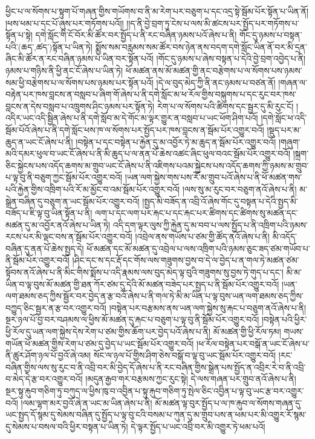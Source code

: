 ཕྱིང་པ་ལ་སོགས་པ་སྟུག་པོ་གཞན་གྱིས་གཡོགས་བ་ནི་མ་རེག་པར་བཅུག་པ་དང་འདྲ་སྟེ་སྦོམ་པོར་སྟོན་པ་ཡིན་ནོ། །ཕས་ཕམ་པ་དང་པོ་ཞུས་པར་གཏོགས་པའོ།། །།ད་ནི་བྱེ་བྲག་ཏུ་ངེས་པ་ལས་མི་ཚངས་པར་སྤྱོད་པར་གཏོགས་པ་སྟོན་པ་སྟེ། དགེ་སློང་གི་ངོ་བོར་མི་ཚོར་བར་སྤྱོད་པ་ནི་རང་བཞིན་ཉམས་པའོ་ཞེས་པ་ནི། གོང་དུ་ཉམས་པ་བསྟན་པའི་(ཆད་‚ཚད་)སྟོན་པ་ཡིན་ཏེ། སྨྱོས་སམ་བརླམས་སམ་ཚོར་བས་ཉེན་ནས་བདག་དགེ་སློང་ཡིན་ནོ་བར་མི་དྲན་ཞིང་མི་ཚོར་ན་རང་བཞིན་ཉམས་པ་ཡིན་བར་སྟོན་པའོ། །གོང་དུ་ཉམས་པ་ཞེས་བསྟན་པ་དེའི་བྱེ་བྲག་འབྱེད་པ་ནི། ཉམས་པ་གཉིས་ནི་ཕྱི་ནང་ངོ་ཞེས་པ་ཡིན་ཏེ། ཕོ་མཚན་ནས་མོ་མཚན་གྱི་ནང་བརྩེགས་པ་ལ་སོགས་པས་ཉམས་སམ་ཕྱི་བརྩེགས་པ་ལ་སོགས་པས་ཉམས་པར་སྟོན་པའོ། །དེ་ལ་བུད་མེད་ཀྱི་ནི་ནང་ཉམས་པ་བཙན་ནོ། །གཞན་ལ་བརྟེན་པར་ཁས་བླངས་ན་བསླབ་པ་ཞིག་གོ་ཞེས་པ་ནི་དགེ་སློང་མ་ཕ་རོལ་གྱིས་བསྐུགས་པ་དང་རུང་བར་ཁས་བླངས་ན་དེས་བསླབ་པ་འཁྲུགས་ཤིང་ཉམས་པར་སྟོན་ཏེ། རེག་པ་ལ་སོགས་པའི་ཚིགས་དང་སྦྱར་དུ་མི་རུང་ངོ། །འདིར་ཡང་འདི་སྦྱིན་ཞེས་པ་ནི་དགེ་སློབ་མ་དེ་གོང་མ་ལྟར་གྱུར་ན་བསླབ་པ་ཡང་ཕོག་ཤིག་པའོ། །དགེ་སློང་ཕ་འདི་སྦོམ་པོའོ་ཞེས་པ་ནི་དགེ་སློང་ཕས་ཁ་ལ་སོགས་པར་སྤྱོད་པར་ཁས་བླངས་ན་སྦོམ་པོར་འགྱུར་བའོ། །སྡུད་པར་མ་ཆུད་ན་ཡང་ངོ་ཞེས་པ་ནི། །བསྟེན་པ་དང་བསྟེན་པ་རྐྱེན་དུ་མ་འབྱོར་ཏེ་མ་ཆུད་ན་སྦོམ་པོར་འགྱུར་བའོ། །གཞུག་མའི་དམར་ཕུལ་བ་ཡང་ངོ་ཞེས་པ་ནི་མི་ཆུད་པ་ལ་ནན་པོ་ཆེས་འཚང་ཞིང་ཕུལ་བའང་སྦོམ་པོར་འགྱུར་བའོ། །སྐྲག་ཅིང་སྐྱེངས་པས་འདོད་ཆགས་མ་གྲུབ་ཡང་ངོ་ཞེས་པ་ནི་འཇིགས་པའམ་སྐྱེངས་པས་འདོད་ཆགས་ཀྱི་ཉམས་མ་གྲུབ་པ་ལྟ་བུ་ནི་བཅུག་ཀྱང་སྦོམ་པོར་འགྱུར་བའོ། །ཡན་ལག་སྐྱེས་གས་པས་རོ་མ་གྲུབ་པའོ་ཞེས་པ་ནི་ཕོ་མཚན་གས་པའི་རྐྱེན་གྱིས་འཁྲིག་པའི་རོ་མ་མྱོང་བ་འམ་སྦོམ་པོར་འགྱུར་བའོ། །ལས་སུ་མ་རུང་བར་བཅུག་ནའོ་ཞེས་པ་ནི། མ་སྒྲེན་བཞིན་དུ་བཅུག་ན་ཡང་སྦོམ་པོར་འགྱུར་བའོ། །སྤྱད་མི་བཟོད་ན་འབྲི་འོ་ཞེས་གོང་དུ་བསྟན་པ་དེའི་སྤྱད་མི་བཟོད་པ་ཇི་ལྟ་བུ་ཡིན་སྟོན་པ་ནི། ལག་པ་དང་ལག་པར་རྐང་པ་དང་རྐང་པར་ཚིགས་དང་ཚིགས་སུ་མཚན་དང་མཚན་དུ་མ་འབྱོར་ནའོ་ཞེས་པ་ཡིན་ཏེ། འདི་དག་ལྟར་ལུས་ཀྱི་རྐྱེན་དུ་མ་བབ་པ་ལས་སྤྱོད་པ་ནི་འཁྲིག་པའི་ཉམས་རངས་པར་མི་ལྡང་བས་ན་སྦོམ་པོར་འགྱུར་བའོ། །འབྲེལ་ནས་གཡོས་པ་ཙམ་གྱི་ཚོད་ནའོ་ཞེས་པ་ནི། མི་འདོད་བཞིན་དུ་ནན་པོ་ཆེས་སྤྱད་དེ། ཕོ་མཚན་དང་མོ་མཚན་དུ་འབྲེལ་པ་ལས་འཁྲིག་པའི་ཉམས་ཅུང་ཟད་ཙམ་གཡོབ་པ་ནི་སྦོམ་པོར་འགྱུར་བའོ། །ཤིང་དང་ས་དང་རྡོ་དང་གོས་ལས་གཟུགས་བྱས་བ་དེ་ལ་བྱེད་པ་ན་གལ་ཏེ་མཚན་ཙམ་སྟོབས་ནའོ་ཞེས་པ་ནི་མིང་གིས་སྨོས་པ་འདི་རྣམས་ལས་བུད་མེད་ལྟ་བུའི་གཟུགས་སུ་བྱས་ཏེ་གུད་པ་དང་། མི་མ་ཡིན་བ་ལྟ་བུས་མོ་མཚན་གྱི་ཐན་ཀོར་ཙམ་དུ་དེའི་མོ་མཚན་བཟེད་པར་སྤྱད་པ་ནི་སྦོམ་པོར་འགྱུར་བའོ། །ཡན་ལག་ཐམས་ཅད་ཀྱིས་སྦྱོར་བར་བྱེད་ན་རྩ་བའོ་ཞེས་པ་ནི་གལ་ཏེ་མི་མ་ཡིན་པ་ལྟ་བུས་ཡན་ལག་ཐམས་ཅད་ཀྱིས་བཀྱུད་ཅིང་སྦྱར་ན་རྩ་བར་འགྱུར་བའོ། །བསྟེན་པར་བརྩམས་ནས་ཡན་ལག་སྐྱེས་སུ་རྐང་པ་བཅུག་ནའོ་ཞེས་པ་ནི། སྔར་ཉལ་པོ་བྱ་བར་བཤམས་ལ་ཕྱིས་མོ་མཚན་དུ་རྐང་པ་བཅུག་པ་ལྟ་བུ་ནི་སྦོམ་པོར་འགྱུར་བའོ། །བསྟེན་པའི་ཕྱིར་ཕྱི་རོལ་དུ་ཡན་ལག་སྐྱེས་དེས་རེག་པ་ཙམ་གྱིས་ཆོག་པར་བྱེད་པའོ་ཞེས་པ་ནི། མོ་མཚན་གྱི་ཕྱི་རོལ་ཏམ། གཡས་གཡོན་ཕོ་མཚན་གྱིས་རེག་པ་ཙམ་དུ་བྱེད་པ་ཡང་སྦོམ་པོར་འགྱུར་བའོ། །ཕ་རོལ་བསྟེན་པར་བསྒོ་ན་ཡང་ངོ་ཞེས་པ་ནི་ཚུར་ཤོག་ཉལ་པོ་བྱའོ་ཞེ་འམ། སོང་ལ་ཉལ་པོ་གྱིས་ཤིག་ཅེས་བསྒོ་བ་ལྟ་བུ་ཡང་སྦོམ་པོར་འགྱུར་བའོ། །རང་བཞིན་གྱིས་ལས་སུ་རུང་བ་ནི་འབྲི་བར་མི་བྱེད་དོ་ཞེས་པ་ནི་རང་བཞིན་གྱིས་སྒྲེན་པས་སྤྱོད་ན་འབྲིར་རེ་བ་ནི་འབྲི་བ་མེད་དེ་རྩ་བར་འགྱུར་བའོ། །མདུན་རྒྱབ་གར་བརྩམས་ཀྱང་རུང་སྟེ། དེ་ལས་གཞན་པར་གྲུབ་ནའོ་ཞེས་པ་ནི། སྔར་སྟུ་རྐུབ་གཅིག་ཏུ་བཀུད་ལ་ཕྱིས་ཁུ་བ་འབྱིན་པ་སྟུ་རྐུབ་གཅིག་ཏུ་སྤེལ་ཅིང་འབྱིན་པ་ལྟ་བུ་ཡང་རྩ་བར་འགྱུར་བའོ། །ལམ་ལྷག་མར་བྱའོ་ཞེ་ན་ཡང་མ་ཡིན་ཞེས་པ་ནི། མོ་མཚན་ལྟ་བུར་སྤྱོད་པ་ལ་ཁ་རྐུབ་ལ་སོགས་གཞན་དུ་ཡང་སྤྱད་དོ་སྙམ་དུ་སེམས་བཞིན་དུ་སྤྱོད་པ་ལྟ་བུ་ངའི་བསམ་པ་ཀུན་དུ་མ་གྲུབ་པས་ན་ཕམ་པར་མི་འགྱུར་རོ་སྙམ་དུ་སེམས་པ་བསལ་བའི་ཕྱིར་བསྟན་པ་ཡིན་ཏེ། དེ་ལྟར་སྤྱོད་པ་ཡང་འབྲི་བར་མི་འགྱུར་ཏེ་ཕམ་པའོ། 